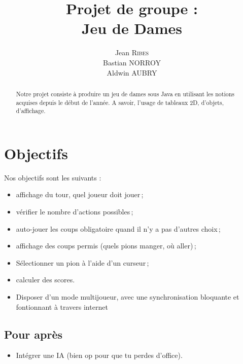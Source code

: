 \documentclass{article}
\title{Projet de groupe :\\ Jeu de Dames} %
\author{Jean \textsc{Ribes}\\Bastian \textsc{NORROY}\\Aldwin \textsc{AUBRY}} %
\date{} %
\begin{document}
\maketitle %
\vfill

\begin{abstract}
Notre projet consiste à produire un jeu de dames sous Java en utilisant les notions acquises depuis le début de l'année. A savoir, l'usage de tableaux 2D, d'objets, d'affichage.
\end{abstract}
\vfill
\section{Objectifs}

Nos objectifs sont les suivants :
\begin{itemize}
\item affichage du tour, quel joueur doit jouer\,;
\item vérifier le nombre d'actions possibles\,;
\item auto-jouer les coups obligatoire quand il n'y a pas d'autres choix\,;
\item affichage des coups permis (quels pions manger, où aller)\,;
\item Sélectionner un pion à l'aide d'un curseur\,;
\item calculer des scores.
\item Disposer d'un mode multijoueur, avec une synchronisation bloquante et fontionnant à travers internet
\end{itemize}
\subsection{Pour après}
\begin{itemize}
\item Intégrer une IA (bien op pour que tu perdes d'office).
\end{itemize}
\newpage
\end{document}
